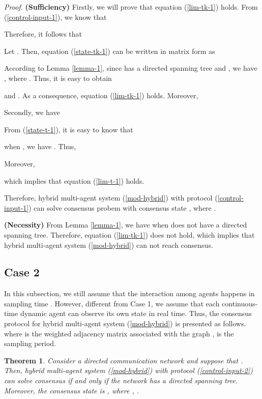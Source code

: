 \documentclass[12pt,draftcls,onecolumn]{IEEEtran}
\newtheorem{theorem}{Theorem}
\begin{document}
{\it Proof.} \textbf{(Sufficiency)} Firstly, we will prove that equation (\ref{lim-tk-1}) holds. From (\ref{control-input-1}), we know that

Therefore, it follows that


Let . Then, equation (\ref{state-tk-1}) can be written in matrix form as

According to Lemma \ref{lemma-1}, since  has a directed spanning tree and , we have
,
where . Thus, it is easy to obtain

and .
As a consequence, equation (\ref{lim-tk-1}) holds. Moreover,


Secondly, we have

From (\ref{state-t-1}),  it is easy to know that

when , we have . Thus,

Moreover,

which implies that equation (\ref{lim-t-1}) holds.

Therefore, hybrid multi-agent system (\ref{mod-hybrid}) with protocol (\ref{control-input-1}) can solve consensus probem with consensus state , where .

\textbf{(Necessity)} From Lemma \ref{lemma-1}, we have  when  does not have a directed spanning tree. Therefore, equation (\ref{lim-tk-1}) does not hold, which implies that hybrid multi-agent system (\ref{mod-hybrid}) can not reach consensus. 



\subsection{Case 2}\label{s-case2}

In this subsection, we still assume that the interaction among agents happens in sampling time . However, different from Case 1, we assume that each continuous-time dynamic agent can observe its own state in real time. Thus, the consensus protocol for hybrid multi-agent system (\ref{mod-hybrid}) is presented as follows. 
where  is the weighted adjacency matrix
associated with the graph ,  is the sampling period.


\begin{theorem}\label{consensus-case2}
Consider a directed communication network  and suppose that . Then, hybrid multi-agent system (\ref{mod-hybrid}) with protocol (\ref{control-input-2}) can solve consensus if and only if the network  has a directed spanning tree. Moreover, the consensus state is , where ,  .
\end{theorem}
\end{document}
